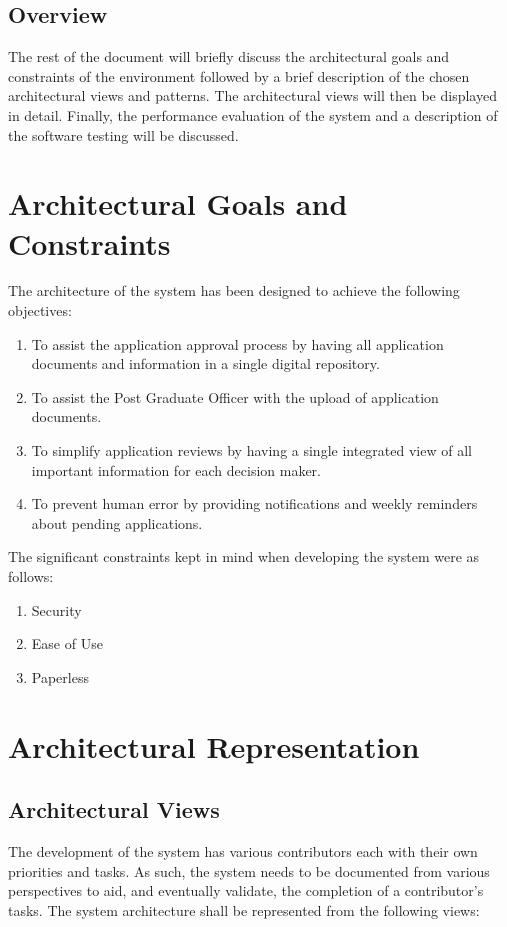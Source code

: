 \documentclass[11pt]{article}
\begin{document}
\subsection{Overview}
The rest of the document will briefly discuss the architectural goals and constraints of the environment followed by a brief description of the chosen architectural views and patterns. The architectural views will then be displayed in detail. Finally, the performance evaluation of the system and a description of the software testing will be discussed.

\section{Architectural Goals and Constraints}
The architecture of the system has been designed to achieve the following objectives:
\begin{enumerate}
	\item To assist the application approval process by having all application documents and information in a single digital repository.
	\item To assist the Post Graduate Officer with the upload of application documents.
	\item To simplify application reviews by having a single integrated view of all important information for each decision maker.
	\item To prevent human error by providing notifications and weekly reminders about pending applications.
	
\end{enumerate}

The significant constraints kept in mind when developing the system were as follows:

\begin{enumerate}
	\item Security
\item Ease of Use
\item Paperless
\end{enumerate}
\section{Architectural Representation}
\subsection{Architectural Views}
The development of the system has various contributors each with their own priorities and tasks. As such, the system needs to be documented from various perspectives to aid, and eventually validate, the completion of a contributor's tasks. The system architecture shall be represented from the following views:
\end{document}
